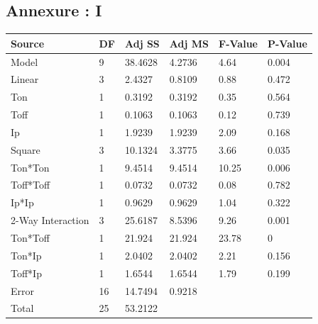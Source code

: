 \documentclass[suppldata]{interact}
\begin{document}
\begin{landscape}
\section { Annexure :  I}
 \begin{minipage}{0.50\textwidth}
\centering
    \centering
\begin{tabular}{|l|l|l|l|l|l|}
    \hline
      Source & DF & Adj SS & Adj MS & F-Value & P-Value \\ \hline
        Model & 9 & 38.4628 & 4.2736 & 4.64 & 0.004 \\ \hline
        Linear & 3 & 2.4327 & 0.8109 & 0.88 & 0.472 \\ \hline
        Ton & 1 & 0.3192 & 0.3192 & 0.35 & 0.564 \\ \hline
        Toff & 1 & 0.1063 & 0.1063 & 0.12 & 0.739 \\ \hline
        Ip & 1 & 1.9239 & 1.9239 & 2.09 & 0.168 \\ \hline
        Square & 3 & 10.1324 & 3.3775 & 3.66 & 0.035 \\ \hline
        Ton*Ton & 1 & 9.4514 & 9.4514 & 10.25 & 0.006 \\ \hline
        Toff*Toff & 1 & 0.0732 & 0.0732 & 0.08 & 0.782 \\ \hline
        Ip*Ip & 1 & 0.9629 & 0.9629 & 1.04 & 0.322 \\ \hline
        2-Way Interaction & 3 & 25.6187 & 8.5396 & 9.26 & 0.001 \\ \hline
        Ton*Toff & 1 & 21.924 & 21.924 & 23.78 & 0 \\ \hline
        Ton*Ip & 1 & 2.0402 & 2.0402 & 2.21 & 0.156 \\ \hline
        Toff*Ip & 1 & 1.6544 & 1.6544 & 1.79 & 0.199 \\ \hline
        Error & 16 & 14.7494 & 0.9218 & ~ & ~ \\ \hline
        Total & 25 & 53.2122 & ~ & ~ & ~ \\ \hline
       

\end{tabular}
\end{minipage}
\end{landscape}
\end{document}
